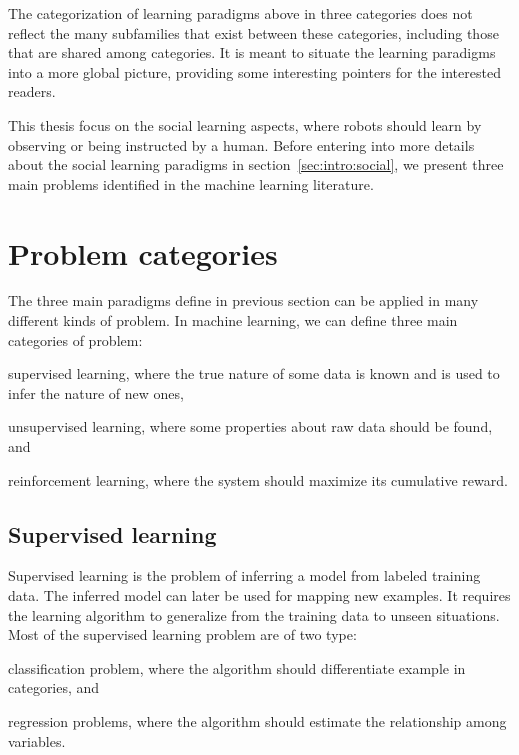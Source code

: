 \transition

The categorization of learning paradigms above in three categories does not reflect the many subfamilies that exist between these categories, including those that are shared among categories. It is meant to situate the learning paradigms into a more global picture, providing some interesting pointers for the interested readers. 

This thesis focus on the social learning aspects, where robots should learn by observing or being instructed by a human. Before entering into more details about the social learning paradigms in section~\ref{sec:intro:social}, we present three main problems identified in the machine learning literature.

\section{Problem categories}

The three main paradigms define in previous section can be applied in many different kinds of problem. In machine learning, we can define three main categories of problem: \begin{inparaenum}[(a)] \item supervised learning, where the true nature of some data is known and is used to infer the nature of new ones, \item unsupervised learning, where some properties about raw data should be found, and \item reinforcement learning, where the system should maximize its cumulative reward. \end{inparaenum}

\subsection{Supervised learning}
\label{chapter:introduction:supervised}

Supervised learning is the problem of inferring a model from labeled training data. The inferred model can later be used for mapping new examples. It requires the learning algorithm to generalize from the training data to unseen situations. Most of the supervised learning problem are of two type: \begin{inparaenum}[(a)] \item classification problem, where the algorithm should differentiate example in categories, and \item regression problems, where the algorithm should estimate the relationship among variables.\end{inparaenum}

